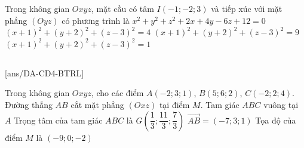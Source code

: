 \begin{vd}%
    Trong không gian $Oxyz$, mặt cầu có tâm $I(-1;-2;3)$ và tiếp xúc với mặt phẳng $(Oyz)$ có phương trình là
    \choice
    {$x^2+y^2+z^2+2x+4y-6z+12=0$}
    {$(x+1)^2+(y+2)^2+(z-3)^2=4$}
    {$(x+1)^2+(y+2)^2+(z-3)^2=9$}
    {\True $(x+1)^2+(y+2)^2+(z-3)^2=1$}
\end{vd}
\subsection{\btrl}
[ans/DA-CD4-BTRL]
\begin{ex}%
    Trong không gian $Oxyz$, cho các điểm $A(-2;3;1)$, $B(5;6;2)$, $C(-2;2;4)$. Đường thẳng $AB$ cắt mặt phẳng $(Oxz)$ tại điểm $M$.
    \choiceTF
    {\True Tam giác $ABC$ vuông tại $A$}
    {\True Trọng tâm của tam giác $ABC$ là $G\left(\dfrac{1}{3};\dfrac{11}{3};\dfrac{7}{3}\right)$}
    {$\overrightarrow{AB}=(-7;3;1)$}
    {Tọa độ của điểm $M$ là $(-9;0;-2)$}
\end{ex}
